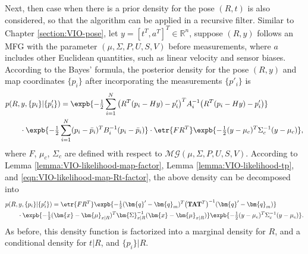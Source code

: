 Next, then case when there is a prior density for the pose $(R,t)$ is also considered, so that the algorithm can be applied in a recursive filter.
Similar to Chapter \ref{section:VIO-pose}, let $y = [t^T, a^T]^T \in \mathbb{R}^n$, suppose $(R,y)$ follows an MFG with the parameter $(\mu,\Sigma,P,U,S,V)$ before measurements, where $a$ includes other Euclidean quantities, such as linear velocity and sensor biases.
According to the Bayes' formula, the posterior density for the pose $(R,y)$ and map coordinates $\{p_i\}$ after incorporating the measurements $\{p'_i\}$ is
\begin{align} \label{eqn:VIO-map-posterior}
	&p(R,y,\{p_i\}|\{p'_i\}) = \expb{-\tfrac{1}{2}\sum_{i=1}^N \big(R^T(p_i-Hy)-p'_i\big)^T A_i^{-1} \big(R^T(p_i-Hy)-p'_i\big)} \nonumber \\
	&\qquad \cdot \expb{-\tfrac{1}{2}\sum_{i=1}^N (p_i-\bar{p}_i)^T B_i^{-1} (p_i-\bar{p}_i)} \cdot \etr{FR^T} \expb{-\tfrac{1}{2}(y-\mu_c)^T \Sigma_c^{-1} (y-\mu_c)},
\end{align}
where $F$, $\mu_c$, $\Sigma_c$ are defined with respect to $\mathcal{MG}(\mu,\Sigma,P,U,S,V)$.
According to Lemma \ref{lemma:VIO-likelihood-map-factor}, Lemma \ref{lemma:VIO-likelihood-tp}, and \eqref{eqn:VIO-likelihood-map-Rt-factor}, the above density can be decomposed into
\begin{align} \label{eqn:VIO-map-posterior-factor1}
	&p(R,y,\{p_i\}|\{p'_i\}) = \etr{FR^T} \expb{-\tfrac{1}{2} (\bm{q}'-\bm{q}_m)^T \big(\mathbf{T}\mathbf{A}\mathbf{T}^T\big)^{-1} (\bm{q}'-\bm{q}_m)} \nonumber \\
	&\qquad \cdot \expb{-\tfrac{1}{2} (\bm{x}-\bm{\mu}_{x|R})^T \bm{\Sigma}_{x|R}^{-1} (\bm{x}-\bm{\mu}_{x|R})} \expb{-\tfrac{1}{2}(y-\mu_c)^T \Sigma_c^{-1} (y-\mu_c)}.
\end{align}
As before, this density function is factorized into a marginal density for $R$, and a conditional density for $t|R$, and $\{p_i\}|R$.

